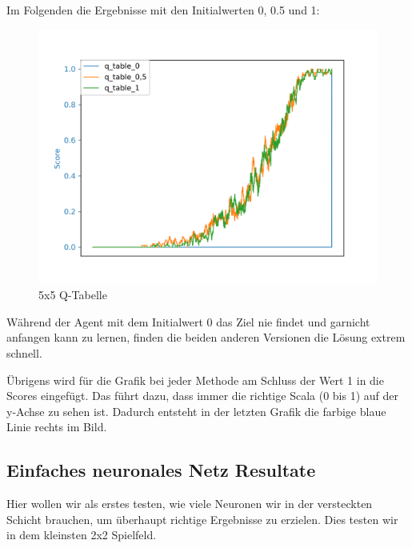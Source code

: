 Im Folgenden die Ergebnisse mit den Initialwerten 0, 0.5 und 1:

\begin{figure}[H]
\centering
\includegraphics[width=\textwidth]{Figures/5x5_q_table_0_q_table_0,5_q_table_1.png}
\caption{5x5 Q-Tabelle}
\label{q2}
\end{figure}

Während der Agent mit dem Initialwert 0 das Ziel nie findet und garnicht anfangen kann zu lernen, finden die beiden anderen Versionen die Lösung extrem schnell.

Übrigens wird für die Grafik bei jeder Methode am Schluss der Wert 1 in die Scores eingefügt. Das führt dazu, dass immer die richtige Scala (0 bis 1) auf der y-Achse zu sehen ist. Dadurch entsteht in der letzten Grafik die farbige blaue Linie rechts im Bild.

\subsection{Einfaches neuronales Netz Resultate}
\label{subsec:dn_r}

Hier wollen wir als erstes testen, wie viele Neuronen wir in der versteckten Schicht brauchen, um überhaupt richtige Ergebnisse zu erzielen. Dies testen wir in dem kleinsten 2x2 Spielfeld.

